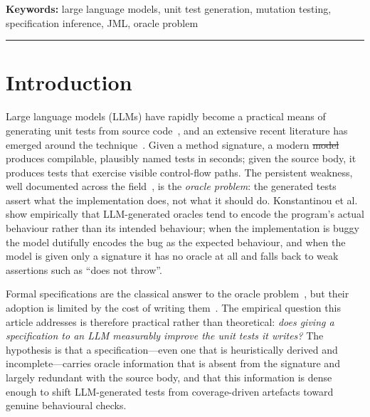 \documentclass[11pt]{article}
\makeatletter
\providecommand{\DIFaddtex}[1]{{\protect\color{blue}\uwave{#1}}} %
\providecommand{\DIFdeltex}[1]{{\protect\color{red}\sout{#1}}} %
\providecommand{\DIFaddbegin}{} %
\providecommand{\DIFaddend}{} %
\providecommand{\DIFdelbegin}{} %
\providecommand{\DIFdelend}{} %
\providecommand{\DIFadd}[1]{\texorpdfstring{\DIFaddtex{#1}}{#1}} %
\providecommand{\DIFdel}[1]{\texorpdfstring{\DIFdeltex{#1}}{}} %
\providecommand{\DIFscaledelfig}{0.5}
\newlength{\DIFdelgraphicswidth} %
\newlength{\DIFdelgraphicsheight} %
\providecommand{\DIFaddincludegraphics}[2][]{{\color{blue}\fbox{\DIFOincludegraphics[#1]{#2}}}} %
\providecommand{\DIFdelincludegraphics}[2][]{%
\sbox{\DIFdelgraphicsbox}{\DIFOincludegraphics[#1]{#2}}%
\settoboxwidth{\DIFdelgraphicswidth}{\DIFdelgraphicsbox} %
\settoboxtotalheight{\DIFdelgraphicsheight}{\DIFdelgraphicsbox} %
\scalebox{\DIFscaledelfig}{%
\parbox[b]{\DIFdelgraphicswidth}{\usebox{\DIFdelgraphicsbox}\\[-\baselineskip] \rule{\DIFdelgraphicswidth}{0em}}\llap{\resizebox{\DIFdelgraphicswidth}{\DIFdelgraphicsheight}{%
\setlength{\unitlength}{\DIFdelgraphicswidth}%
\begin{picture}(1,1)%
\thicklines\linethickness{2pt} %
{\color[rgb]{1,0,0}\put(0,0){\framebox(1,1){}}}%
{\color[rgb]{1,0,0}\put(0,0){\line( 1,1){1}}}%
{\color[rgb]{1,0,0}\put(0,1){\line(1,-1){1}}}%
\end{picture}%
}\hspace*{3pt}}} %
} %
\DeclareRobustCommand{\DIFaddbegin}{\DIFOaddbegin \let\includegraphics\DIFaddincludegraphics} %
\DeclareRobustCommand{\DIFaddend}{\DIFOaddend \let\includegraphics\DIFOincludegraphics} %
\DeclareRobustCommand{\DIFdelbegin}{\DIFOdelbegin \let\includegraphics\DIFdelincludegraphics} %
\DeclareRobustCommand{\DIFdelend}{\DIFOaddend \let\includegraphics\DIFOincludegraphics} %
\let\sout@orig\sout %
\renewcommand{\sout}[1]{\ifmmode\text{\sout@orig{\ensuremath{#1}}}\else\sout@orig{#1}\fi} %
\makeatother
\begin{document}
\vspace{1em}

\noindent\textbf{Keywords:} large language models, unit test generation, mutation testing, specification inference, JML, oracle problem

\vspace{1em}
\hrule
\vspace{1em}

\section{Introduction}
\label{sec:introduction}

Large language models (LLMs) have rapidly become a practical means of generating unit tests from source code~\cite{schafer2023adaptive, chen2022codet, yuan2024chattester, lemieux2023codamosa, chen2021codex}, and an extensive recent literature has emerged around the technique~\cite{zhang2025llmunitsurvey}. Given a method signature, a modern \DIFdelbegin \DIFdel{model }\DIFdelend \DIFaddbegin \DIFadd{LLM }\DIFaddend produces compilable, plausibly named tests in seconds; given the source body, it produces tests that exercise visible control-flow paths. The persistent weakness, well documented across the field~\cite{schafer2023adaptive, jiang2024survey, konstantinou2024oracles}, is the \emph{oracle problem}: the generated tests assert what the implementation does, not what it should do. Konstantinou et al.~\cite{konstantinou2024oracles} show empirically that LLM-generated oracles tend to encode the program's actual behaviour rather than its intended behaviour; when the implementation is buggy the model dutifully encodes the bug as the expected behaviour, and when the model is given only a signature it has no oracle at all and falls back to weak assertions such as ``does not throw''.

Formal specifications are the classical answer to the oracle problem~\cite{meyer1992design, jml, leavens2006design}, but their adoption is limited by the cost of writing them~\cite{matichuk_cost_2015, hall1990seven, zimmermann2019lightweight}. The empirical question this article addresses is therefore practical rather than theoretical: \emph{does giving a specification to an LLM measurably improve the unit tests it writes?} The hypothesis is that a specification---even one that is heuristically derived and incomplete---carries oracle information that is absent from the signature and largely redundant with the source body, and that this information is dense enough to shift LLM-generated tests from coverage-driven artefacts toward genuine behavioural checks.
\end{document}
